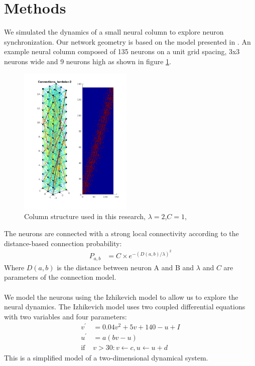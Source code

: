 \documentclass[a4paper,11pt]{article}
\begin{document}
\section{Methods}
We simulated the dynamics of a small neural column to explore neuron synchronization.
Our network geometry is based on the model presented in \cite{markram1998}.
An example neural column composed of 135 neurons on a unit grid spacing, 3x3 neurons wide and 9 neurons high as shown in figure \ref{fig:column_structure}.
\begin{figure}[!htb]
 \caption{Column structure used in this research, $\lambda=2$,$C=1$,}
 \label{fig:column_structure}
 \centering
   \includegraphics[width=0.48\textwidth]{fig/lambda2}
\end{figure}
The neurons are connected with a strong local connectivity according to the distance-based connection probability:
\begin{align}\label{eq:connectivity}
 P_{a,b} &= C \times e^{-(D(a,b)/\lambda)^2}
\end{align}
Where $D(a,b)$ is the distance between neuron A and B and $\lambda$ and $C$ are parameters of the connection model.
\\ \\
We model the neurons using the Izhikevich model \cite{izhikevich2003} to allow us to explore the neural dynamics.
The Izhikevich model uses two coupled differential equations with two variables and four parameters:
\begin{align}
 v^\prime &= 0.04v^2+5v+140-u+I\\
 u^\prime &= a(bv-u)\\
 \text{if } &v>30: v\leftarrow c, u\leftarrow u+d
\end{align}
This is a simplified model of a two-dimensional dynamical system.
\end{document}
